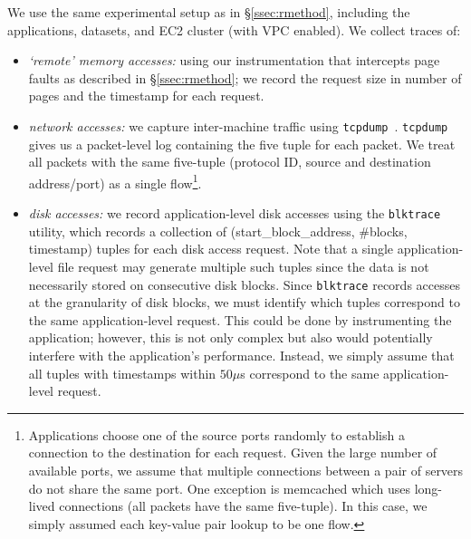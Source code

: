 We use the same experimental setup as in \S\ref{ssec:rmethod}, including the applications, datasets, and EC2 cluster (with VPC enabled). 
We collect traces of: 
\vspace{-0.5em}
\begin{itemize}[leftmargin=*]
\itemsep0em
\item \emph{`remote' memory accesses:} using our instrumentation that intercepts 
page faults as described in \S\ref{ssec:rmethod}; we record the 
request size in number of pages and the timestamp for each request.
\item \emph{network accesses:} we capture inter-machine traffic using {\tt tcpdump}~\cite{tcpdump}. {\tt tcpdump} gives us a packet-level log containing the five tuple for each packet. We treat all packets with the same five-tuple (protocol ID, source and destination address/port) as a single flow{\footnote{Applications choose one of the source ports randomly to establish a connection to the destination for each request. Given the large number of available ports, we assume that multiple connections between a pair of servers do not share the same port.  
One exception is memcached which uses long-lived connections (all packets have the same five-tuple). In this case, we simply assumed each key-value pair lookup to be one flow.}}.
\item \emph{disk accesses:} we record application-level disk accesses using the {\tt blktrace} utility, which records a collection of (start\_block\_address, \#blocks, timestamp) tuples for each disk access request. Note that a single application-level file request may generate multiple such tuples since the data is not necessarily stored on consecutive disk blocks. Since {\tt blktrace} records accesses at the granularity of disk blocks, we must identify which tuples correspond to the same application-level request. This could be done by instrumenting the application; however, this is not only complex but also would potentially interfere with the application's performance. Instead, we simply assume that all tuples with timestamps within $50\mu$s correspond to the same application-level request. 
\end{itemize} 

